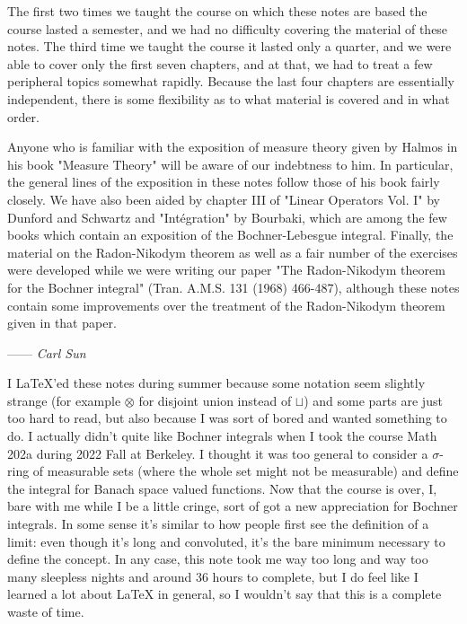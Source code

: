 The first two times we taught the course on which these notes are based the course lasted a semester, and we had no difficulty covering the material of these notes. The third time we taught the course it lasted only a quarter, and we were able to cover only the first seven chapters, and at that, we had to treat a few peripheral topics somewhat rapidly. Because the last four chapters are essentially independent, there is some flexibility as to what material is covered and in what order.

Anyone who is familiar with the exposition of measure theory given by Halmos in his book "Measure Theory" will be aware of our indebtness to him. In particular, the general lines of the exposition in these notes follow those of his book fairly closely. We have also been aided by chapter III of "Linear Operators Vol. I" by Dunford and Schwartz and "Int\'{e}gration" by Bourbaki, which are among the few books which contain an exposition of the Bochner-Lebesgue integral. Finally, the material on the Radon-Nikodym theorem as well as a fair number of the exercises were developed while we were writing our paper "The Radon-Nikodym theorem for the Bochner integral" (Tran. A.M.S. 131 (1968) 466-487), although these notes contain some improvements over the treatment of the Radon-Nikodym theorem given in that paper.



\hspace*{0pt}\hfill------ {\it Carl Sun}


I LaTeX'ed these notes during summer because some notation seem slightly strange (for example $\otimes$ for disjoint union instead of $\sqcup$) and some parts are just too hard to read, but also because I was sort of bored and wanted something to do. I actually didn't quite like Bochner integrals when I took the course Math 202a during 2022 Fall at Berkeley. I thought it was too general to consider a $\sigma$-ring of measurable sets (where the whole set might not be measurable) and define the integral for Banach space valued functions. Now that the course is over, I, bare with me while I be a little cringe, sort of got a new appreciation for Bochner integrals. In some sense it's similar to how people first see the definition of a limit: even though it's long and convoluted, it's the bare minimum necessary to define the concept. In any case, this note took me way too long and way too many sleepless nights and around 36 hours to complete, but I do feel like I learned a lot about LaTeX in general, so I wouldn't say that this is a complete waste of time.